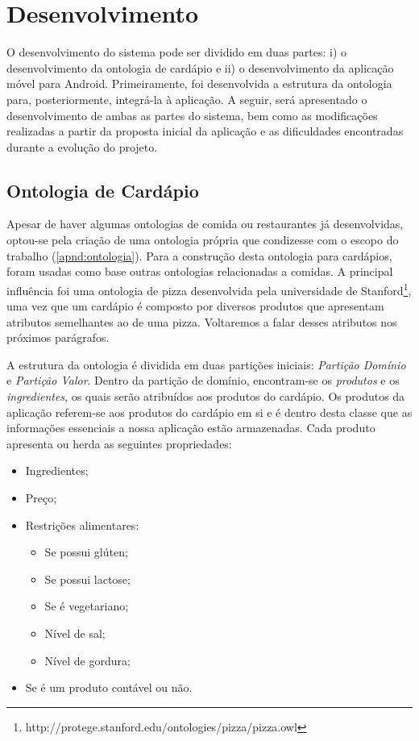 \chapter{\label{chap:desenvolvimento}Desenvolvimento}

O desenvolvimento do sistema pode ser dividido em duas partes: i) o desenvolvimento da ontologia de cardápio e ii) o desenvolvimento da aplicação móvel para Android. Primeiramente, foi desenvolvida a estrutura da ontologia para, posteriormente, integrá-la à aplicação. A seguir, será apresentado o desenvolvimento de ambas as partes do sistema, bem como as modificações realizadas a partir da proposta inicial da aplicação e as dificuldades encontradas durante a evolução do projeto.

\section{\label{sec:ontologia}Ontologia de Cardápio}

Apesar de haver algumas ontologias de comida ou restaurantes já desenvolvidas, optou-se pela criação de uma ontologia própria que condizesse com o escopo do trabalho (\ref{apnd:ontologia}). Para a construção desta ontologia para cardápios, foram usadas como base outras ontologias relacionadas a comidas. A principal influência foi uma ontologia de pizza desenvolvida pela universidade de Stanford\footnote{http://protege.stanford.edu/ontologies/pizza/pizza.owl}, uma vez que um cardápio é composto por diversos produtos que apresentam atributos semelhantes ao de uma pizza. Voltaremos a falar desses atributos nos próximos parágrafos.

A estrutura da ontologia é dividida em duas partições iniciais: \emph{Partição Domínio} e \emph{Partição Valor}. Dentro da partição de domínio, encontram-se os \emph{produtos} e os \emph{ingredientes}, os quais serão atribuídos aos produtos do cardápio. Os produtos da aplicação referem-se aos produtos do cardápio em si e é dentro desta classe que as informações essenciais a nossa aplicação estão armazenadas. Cada produto apresenta ou herda as seguintes propriedades:
\begin{itemize}
	\item Ingredientes;
	\item Preço;
	\item Restrições alimentares:
	\begin{itemize}
		\item Se possui glúten;
		\item Se possui lactose;
		\item Se é vegetariano;
		\item Nível de sal;
		\item Nível de gordura;
	\end{itemize}
	\item Se é um produto contável ou não.
\end{itemize}


